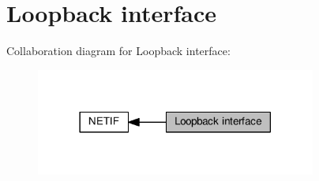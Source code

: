 \hypertarget{group__lwip__opts__loop}{}\section{Loopback interface}
\label{group__lwip__opts__loop}
Collaboration diagram for Loopback interface\+:
\nopagebreak
\begin{figure}[H]
\begin{center}
\leavevmode
\includegraphics[width=261pt]{group__lwip__opts__loop}
\end{center}
\end{figure}
